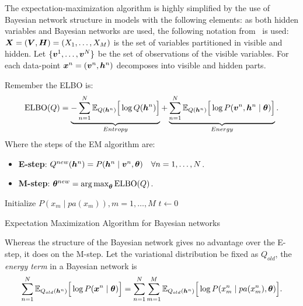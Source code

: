 The expectation-maximization algorithm is highly simplified by the use of Bayesian network structure in models with the following elements: as both hidden variables and Bayesian networks are used, the following notation from~\cite{barber} is used: \(\bm{X} = (\bm{V}, \bm{H}) = (X_{1}, \dots , X_{M})\) is the set of variables partitioned in visible and hidden. Let \(\{\bm{v}^{1}, \dots, \bm{v}^{N}\}\) be the set of observations of the visible variables. For each data-point \(\bm{x}^{n} = (\bm{v}^{n}, \bm{h}^{n})\) decomposes into visible and hidden parts.

Remember the ELBO is:
\[
  \text{ELBO}(Q) = \underbrace{- \sum_{n=1}^{N}\mathbb{E}_{Q(\bm{h}^{n})}\Big[\log{Q(\bm{h}^{n})}\Big]}_{Entropy} + \underbrace{\sum_{n=1}^{N}\mathbb{E}_{Q(\bm{h}^{n})}\Big[\log{P(\bm{v}^{n}, \bm{h}^{n} \mid \bm{\theta})}\Big]}_{Energy}.
\]
Where the steps of the EM algorithm are:
\begin{itemize}
  \item \textbf{E-step}:  \(Q^{new}(\bm{h}^{n}) = P(\bm{h}^{n} \mid \bm{v}^{n} , \bm{\theta}) \quad \forall n=1,\dots,N\).
  \item \textbf{M-step}: \(\bm{\theta}^{new} = \operatorname*{arg\,max}_{\bm{\theta}} \text{ELBO}(Q)\).
\end{itemize}

\begin{algorithm}[t]
  \SetAlgoLined{}
  Initialize \( P(x_{m}\mid pa(x_{m})), m=1,\dots,M \)\;
  \(t \leftarrow 0\)\;
  \;
  \caption{Expectation Maximization Algorithm for Bayesian networks}\label{alg:em_bn}
\end{algorithm}


Whereas the structure of the Bayesian network gives no advantage over the E-step, it does on the M-step. Let the variational distribution be fixed as \(Q_{old}\), the \emph{energy term} in a Bayesian network is
\[
  \sum_{n=1}^{N} \mathbb{E}_{Q_{old}(\bm{h}^{n})}\Big[ \log{P(\bm{x}^{n} \mid \bm{\theta})} \Big] = \sum_{n = 1}^{N}\sum_{m = 1}^{M} \mathbb{E}_{Q_{old}(\bm{h}^{n})}\Big[\log{P( x_{m}^{n} \mid pa(x_{m}^{n}), \bm{\theta})}\Big].
\]

